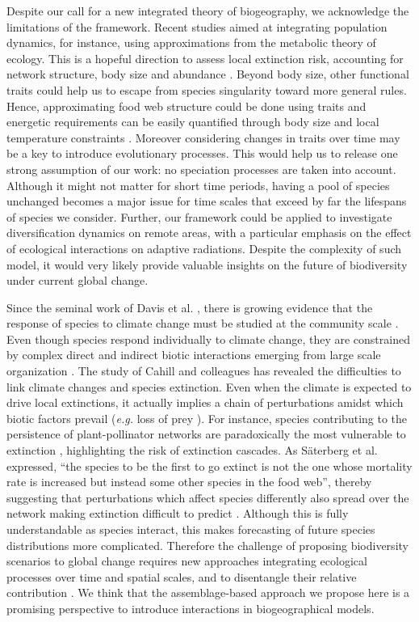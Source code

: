 Despite our call for a new integrated theory of biogeography, we acknowledge the limitations of the framework. Recent studies aimed at integrating population dynamics, for instance, using approximations from the metabolic theory of ecology. This is a hopeful direction to assess local extinction risk, accounting for network structure, body size and abundance \citep{Schneider2012}. Beyond body size, other functional traits \citep{McGill2006} could help us to escape from species singularity toward more general rules. Hence, approximating food web structure could be done using traits \citep{Gravel2013} and energetic requirements can be easily quantified through body size and local temperature constraints \citep{Brown2004}. Moreover considering changes in traits over time may be a key to introduce evolutionary processes. This would help us to release one strong assumption of our work: no speciation processes are taken into account. Although it might not matter for short time periods, having a pool of species unchanged becomes a major issue for time scales that exceed by far the lifespans of species we consider. Further, our framework could be applied to investigate diversification dynamics on remote areas, with a particular emphasis on the effect of ecological interactions on adaptive radiations. Despite the complexity of such model, it would very likely provide valuable insights on the future of biodiversity under current global change.

Since the seminal work of Davis et al. \citep{Davis1998}, there is growing evidence that the response of species to climate change must be studied at the community scale \citep{Suttle2007}. Even though species respond individually to climate change, they are constrained by complex direct and indirect biotic interactions emerging from large scale organization \citep{Lavergne2010}. The study of Cahill and colleagues \citep{Cahill2013} has revealed the difficulties to link climate changes and species extinction. Even when the climate is expected to drive local extinctions, it actually implies a chain of perturbations amidst which biotic factors prevail (\emph{e.g.} loss of prey \citep{Durance2010}). For instance, species contributing to the persistence of plant-pollinator networks are paradoxically the most vulnerable to extinction \citep{Saavedra2011}, highlighting the risk of extinction cascades. As S\"aterberg et al. expressed, ``the species to be the first to go extinct is not the one whose mortality rate is increased but instead some other species in the food web'', thereby suggesting that perturbations which affect species differently also spread over the network making extinction difficult to predict \citep{Saterberg2013}. Although this is fully understandable as species interact, this makes forecasting of future species distributions more complicated. Therefore the challenge of proposing biodiversity scenarios to global change requires new approaches integrating ecological processes over time and spatial scales, and to disentangle their relative contribution \citep{Lavergne2010}. We think that the assemblage-based approach we propose here is a promising perspective to introduce interactions in biogeographical models.


